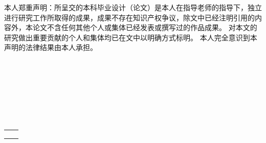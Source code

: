 
\begin{declarationzh}
	
本人郑重声明：所呈交的本科毕业设计（论文）是本人在指导老师的指导下，独立进行研究工作所取得的成果，成果不存在知识产权争议，除文中已经注明引用的内容外，本论文不含任何其他个人或集体已经发表或撰写过的作品成果。
对本文的研究做出重要贡献的个人和集体均已在文中以明确方式标明。
本人完全意识到本声明的法律结果由本人承担。
\\
\\
\\
\\
\\
\\
\\
\\
	
	\vspace{30pt}
	\begin{tabular}{ll}
		\makebox[4em][s]{作者签名：} & \makebox[100pt][c]{彭振} \\
		\\
		\makebox[2em][s]{日期:}	 &
		\makebox[100pt][c]{\qquad2026年\quad 11月\quad 14日 } \\
	\end{tabular}

	
	
\end{declarationzh}
